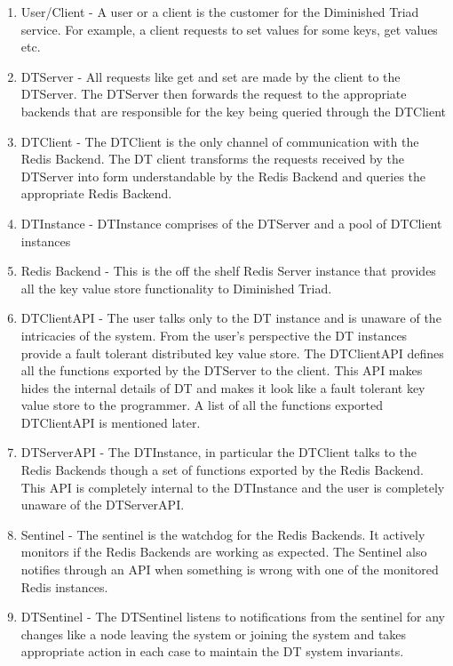 \documentclass[10pt,twocolumn,letterpaper]{article}
\begin{document}
\begin{enumerate}
  \item User/Client - A user or a client is the customer for the Diminished Triad service. For example, a client requests to set values for some keys, get values etc.
  \item DTServer - All requests like get and set are made by the client to the DTServer. The DTServer then forwards the request to the appropriate backends that are responsible for the key being queried through the DTClient
  \item DTClient - The DTClient is the only channel of communication with the Redis Backend. The DT client transforms the requests received by the DTServer into form understandable by the Redis Backend and queries the appropriate Redis Backend.
  \item DTInstance - DTInstance comprises of the DTServer and a pool of DTClient instances
  \item Redis Backend - This is the off the shelf Redis Server instance that provides all the key value store functionality to Diminished Triad.
  \item DTClientAPI - The user talks only to the DT instance and is unaware of the intricacies of the system. From the user's perspective the DT instances provide a fault tolerant distributed key value store. The DTClientAPI defines all the functions exported by the DTServer to the client. This API makes hides the internal details of DT and makes it look like a fault tolerant key value store to the programmer. A list of all the functions exported DTClientAPI is mentioned later.
  \item DTServerAPI - The DTInstance, in particular the DTClient talks to the Redis Backends though a set of functions exported by the Redis Backend. This API is completely internal to the DTInstance and the user is completely unaware of the DTServerAPI.
  \item Sentinel - The sentinel is the watchdog for the Redis Backends. It actively monitors if the Redis Backends are working as expected. The Sentinel also notifies through an API when something is wrong with one of the monitored Redis instances.
   \item DTSentinel -  The DTSentinel listens to notifications from the sentinel for any changes like a node leaving the system or joining the system and takes appropriate action in each case to maintain the DT system invariants.
\end{enumerate}
\end{document}
